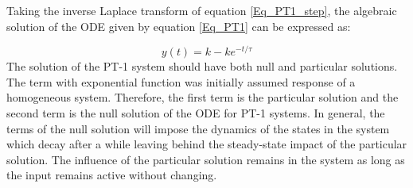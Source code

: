 Taking the inverse Laplace transform of equation \eqref{Eq_PT1_step}, the algebraic solution of the ODE given by equation \eqref{Eq_PT1} can be expressed as:

\begin{equation}\label{Eq_PT1_stepResponse}
y(t) = k - k e^{-t/\tau}
\end{equation}
The solution of the PT-1 system should have both null and particular solutions. The term with exponential function was initially assumed response of a homogeneous system. Therefore, the first term is the particular solution and the second term is the null solution of the ODE for PT-1 systems. In general, the terms of the null solution will impose the dynamics of the states in the system which decay after a while leaving behind the steady-state impact of the particular solution. The influence of the particular solution remains in the system as long as the input remains active without changing.

